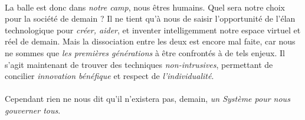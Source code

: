 \paragraph{} La balle est donc dans \emph{notre camp}, nous êtres humains. Quel sera
notre choix pour la société de demain ? Il ne tient qu'à nous de saisir
l'opportunité de l'élan technologique pour \emph{créer, aider}, et inventer
intelligemment notre espace virtuel et réel de demain. Mais la dissociation entre
les deux est encore mal faite, car nous ne sommes que \emph{les premières générations}
à être confrontés à de tels enjeux. Il s'agit maintenant de trouver des techniques
\emph{non-intrusives}, permettant de concilier \emph{innovation bénéfique} et
respect de \emph{l'individualité}.

\paragraph{} Cependant rien ne nous dit qu'il n'existera pas, demain, \emph{un Système pour nous
gouverner tous}.